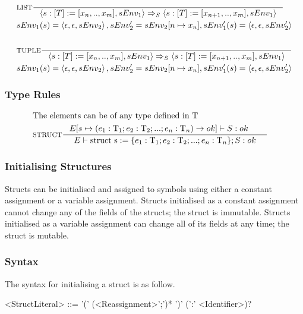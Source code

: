 \begin{align*}
&\inference[$\text{LIST}$]{}
                            {\Braket{s:[T] := [x_n,..,x_m],sEnv_1} \Rightarrow_S \Braket{s:[T] := [x_{n+1},..,x_m],sEnv_1}}
\\
&{sEnv_1(s) = \Braket{\epsilon,\epsilon,sEnv_2},sEnv_2' = sEnv_2[n \mapsto x_n],sEnv_1'(s) = \Braket{\epsilon,\epsilon,sEnv_2'}}
\\\\
&\inference[$\text{TUPLE}$]{}
                           {\Braket{s:[T] := [x_n,..,x_m],sEnv_1} \Rightarrow_S \Braket{s:[T] := [x_{n+1},..,x_m],sEnv_1}}
\\
&{sEnv_1(s) = \Braket{\epsilon,\epsilon,sEnv_2},sEnv_2' = sEnv_2[n \mapsto x_n],sEnv_1'(s) = \Braket{\epsilon,\epsilon,sEnv_2'}}
\end{align*}

\subsubsection{Type Rules}

\begin{align*}
\intertext{The elements can be of any type defined in $\Tt$}
&\inference[STRUCT]{E[s \mapsto (e_1:\Tt_1;e_2:\Tt_2;...;e_n:\Tt_n) \rightarrow ok]\vdash S : ok & }
                 {\Tenv \mathbin{\text{struct s}} := \{e_1:\Tt_1;e_2:\Tt_2;...;e_n:\Tt_n\}; S: ok}
\end{align*}



\subsubsection{Initialising Structures}
\label{sec:initStructures}

Structs can be initialised and assigned to symbols using either a constant assignment or a variable assignment. Structs initialised as a constant assignment cannot change any of the fields of the structs; the struct is immutable. Structs initialised as a variable assignment can change all of its fields at any time; the struct is mutable.

\subsubsection{Syntax}

The syntax for initialising a struct is as follow.

\begin{grammar}
<StructLiteral> ::= '(' (<Reassignment>';')* ')' (':' <Identifier>)?
\end{grammar}


